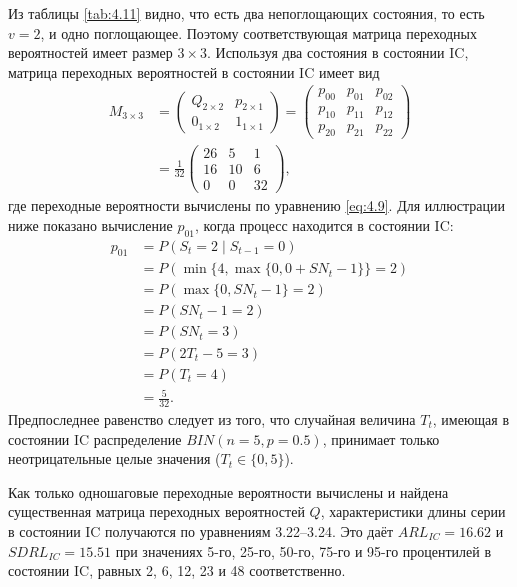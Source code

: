 Из таблицы \ref{tab:4.11} видно, что есть два непоглощающих состояния, то есть \(v = 2\), и одно поглощающее. Поэтому соответствующая матрица переходных вероятностей имеет размер \(3 \times 3\). Используя два состояния в состоянии IC, матрица переходных вероятностей в состоянии IC имеет вид
\begin{align*}
	M_{3\times3}
	&= \left(\begin{array}{c|c} Q_{2\times2} & p_{2\times1} \\ \hline 0_{1\times2} & 1_{1\times1} \end{array}\right)
	= \left(\begin{array}{cc|c} p_{00} & p_{01} & p_{02} \\ p_{10} & p_{11} & p_{12} \\ \hline p_{20} & p_{21} & p_{22} \end{array}\right) \\
	&= \frac{1}{32}\left(\begin{array}{cc|c} 26 & 5 & 1 \\ 16 & 10 & 6 \\ \hline 0 & 0 & 32 \end{array}\right),
\end{align*}
где переходные вероятности вычислены по уравнению \eqref{eq:4.9}. Для иллюстрации ниже показано вычисление \(p_{01}\), когда процесс находится в состоянии IC:
\begin{align*}
	p_{01} &= P(S_t = 2 \mid S_{t-1} = 0) \\
	      &= P(\min\{4, \max\{0, 0 + SN_t - 1\}\} = 2) \\
	      &= P(\max\{0, SN_t - 1\} = 2) \\
	      &= P(SN_t - 1 = 2) \\
	      &= P(SN_t = 3) \\
	      &= P(2T_t - 5 = 3) \\
	      &= P(T_t = 4) \\
	      &= \frac{5}{32}.
\end{align*}
Предпоследнее равенство следует из того, что случайная величина \(T_t\), имеющая в состоянии IC распределение \(BIN(n = 5, p = 0.5)\), принимает только неотрицательные целые значения (\(T_t \in \{0, 5\}\)).

Как только одношаговые переходные вероятности вычислены и найдена существенная матрица переходных вероятностей \(Q\), характеристики длины серии в состоянии IC получаются по уравнениям 3.22--3.24. Это даёт \(ARL_{IC} = 16.62\) и \(SDRL_{IC} = 15.51\) при значениях 5-го, 25-го, 50-го, 75-го и 95-го процентилей в состоянии IC, равных 2, 6, 12, 23 и 48 соответственно.

